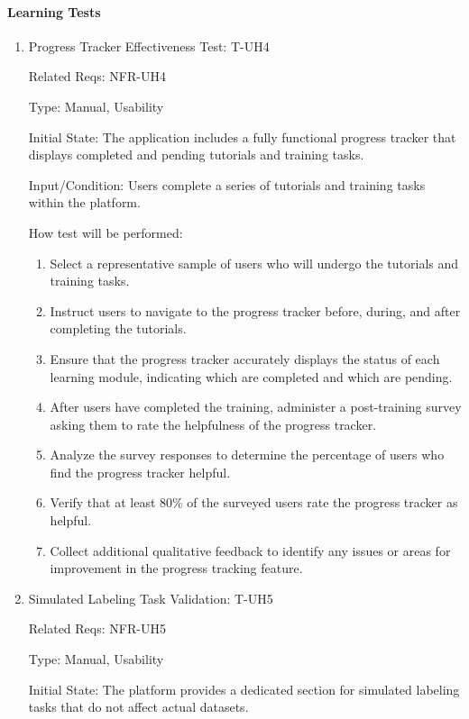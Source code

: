 \documentclass[12pt, titlepage]{article}
\begin{document}
\paragraph{Learning Tests}
\begin{enumerate}

\item{Progress Tracker Effectiveness Test: T-UH4\\}

Related Reqs: NFR-UH4

Type: Manual, Usability

Initial State: The application includes a fully functional progress tracker that displays completed and pending tutorials and training tasks.

Input/Condition: Users complete a series of tutorials and training tasks within the platform.

How test will be performed:
\begin{enumerate}
    \item Select a representative sample of users who will undergo the tutorials and training tasks.
    \item Instruct users to navigate to the progress tracker before, during, and after completing the tutorials.
    \item Ensure that the progress tracker accurately displays the status of each learning module, indicating which are completed and which are pending.
    \item After users have completed the training, administer a post-training survey asking them to rate the helpfulness of the progress tracker.
    \item Analyze the survey responses to determine the percentage of users who find the progress tracker helpful.
    \item Verify that at least 80\% of the surveyed users rate the progress tracker as helpful.
    \item Collect additional qualitative feedback to identify any issues or areas for improvement in the progress tracking feature.
\end{enumerate}

\item{Simulated Labeling Task Validation: T-UH5\\}

Related Reqs: NFR-UH5

Type: Manual, Usability

Initial State: The platform provides a dedicated section for simulated labeling tasks that do not affect actual datasets.


\end{enumerate}
\end{document}
